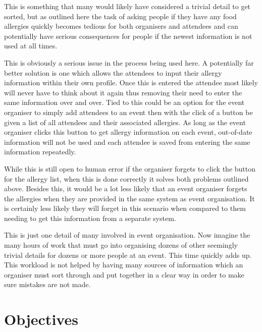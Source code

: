 This is something that many would likely have considered a trivial detail to get sorted, but as outlined here the task of asking people if they have any food allergies quickly becomes tedious for both organisers and attendees and can potentially have serious consequences for people if the newest information is not used at all times. 

This is obviously a serious issue in the process being used here. A potentially far better solution is one which allows the attendees to input their allergy information within their own profile. Once this is entered the attendee most likely will never have to think about it again thus removing their need to enter the same information over and over. Tied to this could be an option for the event organiser to simply add attendees to an event then with the click of a button be given a list of all attendees and their associated allergies. As long as the event organiser clicks this button to get allergy information on each event, out-of-date information will not be used and each attendee is saved from entering the same information repeatedly. 

While this is still open to human error if the organiser forgets to click the button for the allergy list, when this is done correctly it solves both problems outlined above. Besides this, it would be a lot less likely that an event organiser forgets the allergies when they are provided in the same system as event organisation. It is certainly less likely they will forget in this scenario when compared to them needing to get this information from a separate system.

This is just one detail of many involved in event organisation. Now imagine the many hours of work that must go into organising dozens of other seemingly trivial details for dozens or more people at an event. This time quickly adds up. This workload is not helped by having many sources of information which an organiser must sort through and put together in a clear way in order to make sure mistakes are not made.

\section{Objectives}
\label{section:objectives}

